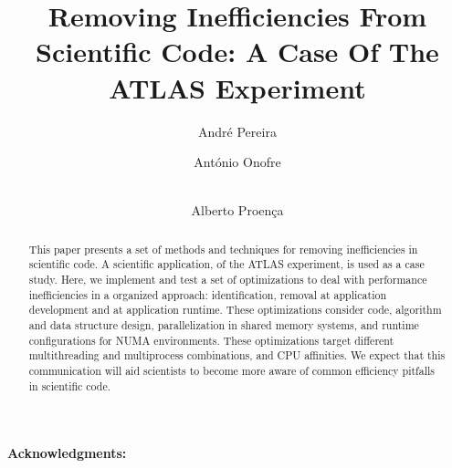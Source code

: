 \documentclass[runningheads,a4paper]{llncs}
\begin{document}
\title{Removing Inefficiencies From Scientific Code: A Case Of The ATLAS Experiment}




%
%
\author{André Pereira \and António Onofre  \and \\ Alberto Proença}
%



\maketitle              %

\begin{abstract}

This paper presents a set of methods and techniques for removing inefficiencies in scientific code. A scientific application, of the ATLAS experiment, is used as a case study. Here, we implement and test a set of optimizations to deal with performance inefficiencies in a organized approach: identification, removal at application development and at application runtime. These optimizations consider code, algorithm and data structure design, parallelization in shared memory systems, and runtime configurations for NUMA environments. These optimizations target different multithreading and multiprocess combinations, and CPU affinities. We expect that this communication will aid scientists to become more aware of common efficiency pitfalls in scientific code.

\end{abstract}
%








\paragraph{Acknowledgments:}




\end{document}
